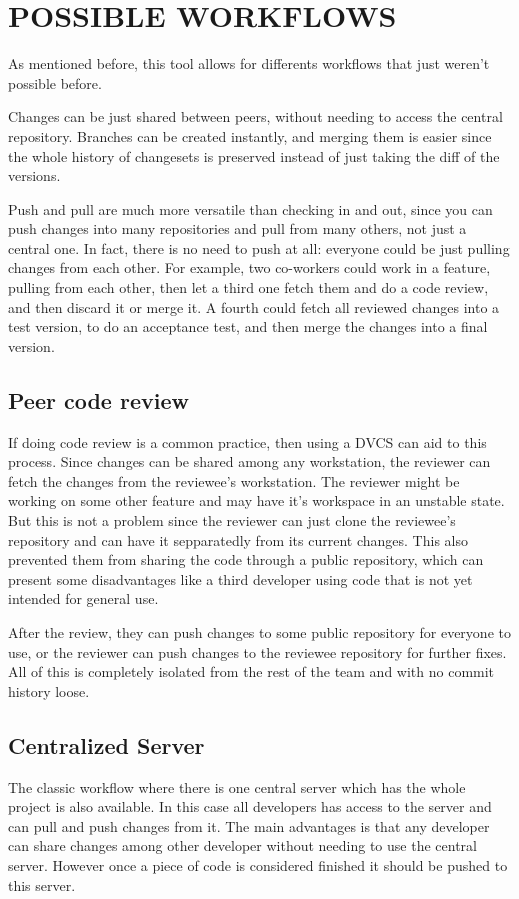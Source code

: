 \section{POSSIBLE WORKFLOWS}

As mentioned before, this tool allows for differents workflows that just weren't 
possible before.

Changes can be just shared between peers, without needing to access the central 
repository. Branches can be created instantly, and merging them is easier since 
the whole history of changesets is preserved instead of just taking the diff of 
the versions.

Push and pull are much more versatile than checking in and out, since you can push 
changes into many repositories and pull from many others, not just a central one.
In fact, there is no need to push at all:
everyone could be just pulling changes from each other. For example, two co-workers could work 
in a feature, pulling from each other, then let a third one fetch them and do a code review, and then 
discard it or merge it. A fourth could fetch all reviewed changes into a test version, to do an 
acceptance test, and then merge the changes into a final version.

\subsection{Peer code review}
If doing code review is a common practice, then using a DVCS can aid to this process. Since changes can be shared
among any workstation, the reviewer can fetch the changes from the reviewee's workstation. The reviewer might be
working on some other feature and may have it's workspace in an unstable state. But this is not a problem since the
reviewer can just clone the reviewee's repository and can have it sepparatedly from its current changes.
This also prevented them from sharing the code through a public repository, which can present some disadvantages like
a third developer using code that is not yet intended for general use.

After the review, they can push changes to some public repository for everyone to use, or the reviewer can push changes to the reviewee repository for further fixes. All of this is completely isolated from the rest of the team and with no commit history loose.


\subsection{Centralized Server}
The classic workflow where there is one central server which has the whole project is also available. In this case all developers has access to the server and can pull and push changes from it. The main advantages is that any developer can share changes among other developer without needing to use the central server. However once a piece of code is considered finished it should be pushed to this server.

